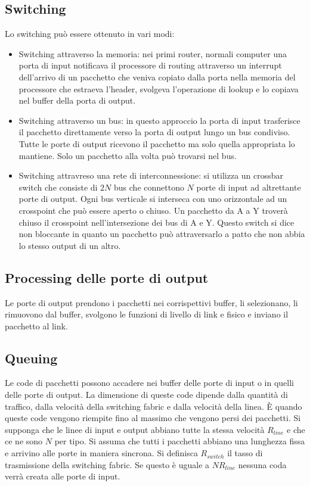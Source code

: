 \subsection{Switching}
Lo switching pu\`o essere ottenuto in vari modi:
\begin{itemize}
\item Switching attraverso la memoria: nei primi router, normali computer una porta di input notificava il processore di routing attraverso un interrupt 
dell'arrivo di un pacchetto che veniva copiato dalla porta nella memoria del processore che estraeva l'header, svolgeva l'operazione di lookup e lo copiava
nel buffer della porta di output. 
\item Switching attraverso un bus: in questo approccio la porta di input trasferisce il pacchetto direttamente verso la porta di output lungo un bus 
condiviso. Tutte le porte di output ricevono il pacchetto ma solo quella appropriata lo mantiene. Solo un pacchetto alla volta pu\`o trovarsi nel bus.
\item Switching attravreso una rete di interconnessione: si utilizza un crossbar switch che consiste di $2N$ bus che connettono $N$ porte di input ad 
altrettante porte di output. Ogni bus verticale si interseca con uno orizzontale ad un crosspoint che pu\`o essere aperto o chiuso. Un pacchetto da A a Y
trover\`a chiuso il crosspoint nell'intersezione dei bus di A e Y. Questo switch si dice non bloccante in quanto un pacchetto pu\`o attraversarlo a patto 
che non abbia lo stesso output di un altro.
\end{itemize}
\subsection{Processing delle porte di output}
Le porte di output prendono i pacchetti nei corrispettivi buffer, li selezionano, li rimuovono dal buffer, svolgono le funzioni di livello di link e fisico
e inviano il pacchetto al link.
\subsection{Queuing}
Le code di pacchetti possono accadere nei buffer delle porte di input o in quelli delle porte di output. La dimensione di queste code dipende dalla 
quantit\`a di traffico, dalla velocit\`a della switching fabric e dalla velocit\`a della linea. \`E quando queste code vengono riempite fino al massimo che
vengono persi dei pacchetti. Si supponga che le linee di input e output abbiano tutte la stessa velocit\`a $R_{line}$ e che ce ne sono $N$ per tipo. Si 
assuma che tutti i pacchetti abbiano una lunghezza fissa e arrivino alle porte in maniera sincrona. Si definisca $R_{switch}$ il tasso di trasmissione della
switching fabric. Se questo \`e uguale a $NR_{line}$ nessuna coda verr\`a creata alle porte di input. 
